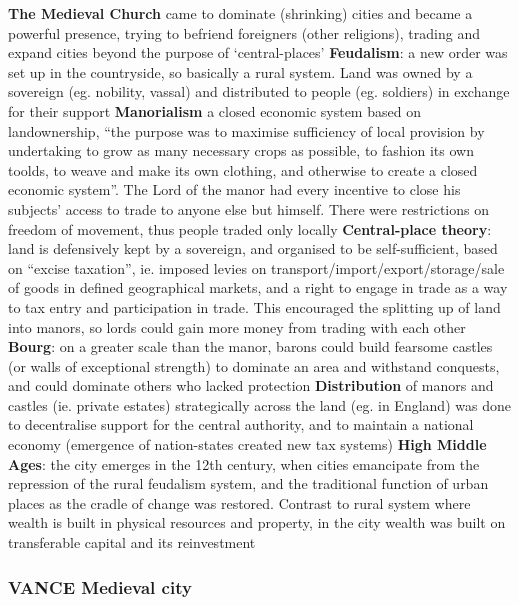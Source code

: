 \documentclass{article}
\begin{document}
\begin{outline}
	\1 \textbf{The Medieval Church} came to dominate (shrinking) cities and became a powerful presence, trying to befriend foreigners (other religions),  trading and expand cities beyond the purpose of `central-places'
	\1 \textbf{Feudalism}: a new order was set up in the countryside, so basically a rural system. Land was owned by a sovereign (eg. nobility, vassal) and distributed to people (eg. soldiers) in exchange for their support
		\2 \textbf{Manorialism} a closed economic system based on landownership, ``the purpose was to maximise sufficiency of local provision by undertaking to grow as many necessary crops as possible, to fashion its own toolds, to weave and make its own clothing, and otherwise to create a closed economic system''. The Lord of the manor had every incentive to close his subjects' access to trade to anyone else but himself. There were restrictions on freedom of movement, thus people traded only locally
		\2 \textbf{Central-place theory}: land is defensively kept by a sovereign, and organised to be self-sufficient, based on ``excise taxation'', ie. imposed levies on transport/import/export/storage/sale of goods in defined geographical markets, and a right to engage in trade as a way to tax entry and participation in trade. This encouraged the splitting up of land into manors, so lords could gain more money from trading with each other
		\2 \textbf{Bourg}: on a greater scale than the manor, barons could build fearsome castles (or walls of exceptional strength) to dominate an area and withstand conquests, and could dominate others who lacked protection
		\2 \textbf{Distribution} of manors and castles (ie. private estates) strategically across the land (eg. in England) was done to decentralise support for the central authority, and to maintain a national economy (emergence of nation-states created new tax systems)
	\1 \textbf{High Middle Ages}: the city emerges in the 12th century, when cities emancipate from the repression of the rural feudalism system, and the traditional function of urban places as the cradle of change was restored. Contrast to rural system where wealth is built in physical resources and property, in the city wealth was built on transferable capital and its reinvestment
\end{outline}

\subsubsection{VANCE Medieval city}
\end{document}
